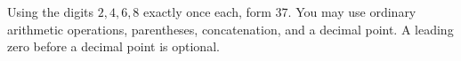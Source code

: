 Using the digits $2,4,6,8$ exactly once each, form 37. You may use ordinary arithmetic operations, parentheses, concatenation, and a decimal point. A leading zero before a decimal point is optional.
